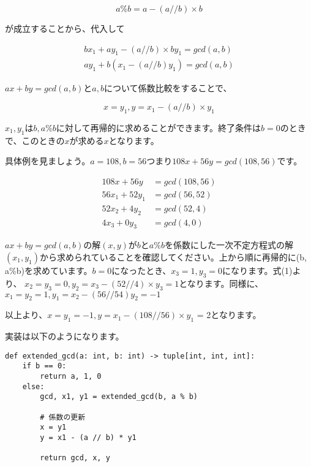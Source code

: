 \documentclass{jlreq}
\begin{document}
\begin{equation*}
    a \% b = a - (a//b) \times b
\end{equation*}

が成立することから、代入して

\begin{align*}
    b x_1 + ay_1 - (a//b) \times b y_1 = gcd(a, b) \\
    ay_1 + b(x_1 - (a//b) y_1) = gcd(a, b)
\end{align*}

$a x + b y = gcd(a, b)$と$a, b$について係数比較をすることで、

\begin{equation}
    x = y_1, y = x_1 - (a//b) \times y_1
\end{equation}


$x_1, y_1$は$b, a\%b$に対して再帰的に求めることができます。終了条件は$b = 0$のときで、このときの$x$が求める$x$となります。

具体例を見ましょう。$a = 108, b = 56$つまり$108 x + 56 y = gcd(108, 56)$です。

\begin{align*}
    108 x + 56 y &= gcd(108, 56) \\
    56 x_1 + 52 y_1 &= gcd(56, 52) \\
    52 x_2 + 4 y_2 &= gcd(52, 4) \\
    4 x_3 + 0 y_3 &= gcd(4, 0)
\end{align*}

$a x + by = gcd(a, b)$の解$(x, y)$が$b$と$a\%b$を係数にした一次不定方程式の解$(x_1, y_1)$から求められていることを確認してください。上から順に再帰的に(b, a\%b)を求めています。$b = 0$になったとき、$x_3 = 1, y_3 = 0$になります。式(1)より、
$x_2 = y_3 = 0, y_2 = x_3 - (52//4) \times y_3 = 1$となります。同様に、$x_1 = y_2 = 1, y_1 = x_2 - (56 // 54) y_2 = - 1$

以上より、$x = y_1 = -1, y = x_1 - (108 // 56) \times y_1$ = 2となります。

実装は以下のようになります。

\begin{lstlisting}[caption=拡張ユークリッドの互助法実装, frame=TRBL, label={euclid}]
def extended_gcd(a: int, b: int) -> tuple[int, int, int]:
    if b == 0:
        return a, 1, 0
    else:
        gcd, x1, y1 = extended_gcd(b, a % b)
    
        # 係数の更新
        x = y1
        y = x1 - (a // b) * y1
        
        return gcd, x, y
    

\end{lstlisting}
\end{document}
